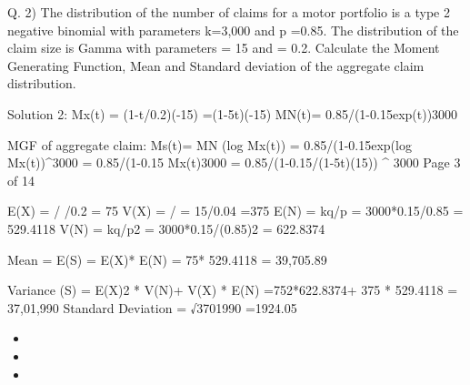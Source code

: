\documentclass[a4paper,12pt]{article}
\begin{document}


Q. 2)
The distribution of the number of claims for a motor portfolio is a type 2 negative binomial with parameters k=3,000 and p =0.85. 
The distribution of the claim size is Gamma with parameters \alpha = 15 and \lambda = 0.2.
Calculate the Moment Generating Function, Mean and Standard deviation of the aggregate claim distribution.



Solution 2:
Mx(t) = (1-t/0.2)(-15) =(1-5t)(-15)
MN(t)= {0.85/(1-0.15exp(t))}3000

MGF of aggregate claim:
Ms(t)= MN (log Mx(t))
= {0.85/(1-0.15exp(log Mx(t))}^3000
= {0.85/(1-0.15 Mx(t)}3000
= {0.85/(1-0.15/(1-5t)(15))} ^ 3000
Page 3 of 14

E(X) = \alpha/  /0.2 = 75
V(X) = \alpha/ 
= 15/0.04 =375 
E(N) = kq/p = 3000*0.15/0.85 = 529.4118
V(N) = kq/p2 = 3000*0.15/(0.85)2 = 622.8374

Mean = E(S) = E(X)* E(N) = 75* 529.4118 = 39,705.89

Variance (S) = {E(X)}2 * V(N)+ V(X) * E(N)
=752*622.8374+ 375 * 529.4118 = 37,01,990
Standard Deviation = √3701990 =1924.05 

\begin{itemize}
\item 
\item 
\item 
\end{itemize}
\end{document}
